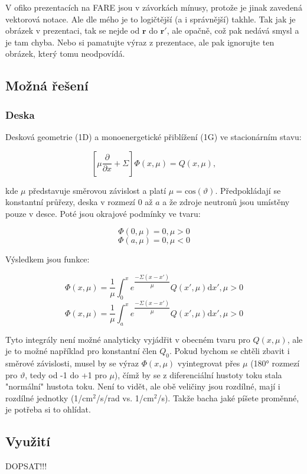 V ofiko prezentacích na FARE jsou v závorkách mínusy, protože je jinak zavedená vektorová notace. Ale dle mého je to logičtější (a i správnější) takhle. Tak jak je obrázek v prezentaci, tak se nejde od $\textbf{r}$ do $\textbf{r}'$, ale opačně, což pak nedává smysl a je tam chyba. Nebo si pamatujte výraz z prezentace, ale pak ignorujte ten obrázek, který tomu neodpovídá.

\subsection{Možná řešení}

\subsubsection{Deska}

Desková geometrie (1D) a monoenergetické přiblížení (1G) ve stacionárním stavu:

$$\left [ \mu \dfrac{\partial}{\partial x} + \Sigma \right ] \Phi(x, \mu) = Q(x, \mu),$$

\noindent kde $\mu$ představuje směrovou závislost a platí $\mu = \text{cos}(\vartheta)$. Předpokládají se konstantní průřezy, deska v rozmezí $0$ až $a$ a že zdroje neutronů jsou umístěny pouze v desce. Poté jsou okrajové podmínky ve tvaru:

$$\Phi(0, \mu) = 0, \mu > 0$$
$$\Phi(a, \mu) = 0, \mu < 0$$

Výsledkem jsou funkce:

$$\Phi(x, \mu) = \dfrac{1}{\mu} \int_0^x e^{\dfrac{-\Sigma (x-x')}{\mu}} Q(x', \mu) \text{d}x', \mu > 0$$
$$\Phi(x, \mu) = \dfrac{1}{\mu} \int_a^x e^{\dfrac{-\Sigma (x-x')}{\mu}} Q(x', \mu) \text{d}x', \mu > 0$$

Tyto integrály není možné analyticky vyjádřit v obecném tvaru pro $Q(x, \mu)$, ale je to možné například pro konstantní člen $Q_0$. Pokud bychom se chtěli zbavit i směrové závislosti, musel by se výraz $\Phi(x, \mu)$ vyintegrovat přes $\mu$ (180° rozmezí pro $\vartheta$, tedy od -1 do +1 pro $\mu$), čímž by se z diferenciální hustoty toku stala "normální" hustota toku. Není to vidět, ale obě veličiny jsou rozdílné, mají i rozdílné jednotky (1/cm$^2$/s/rad vs. 1/cm$^2$/s). Takže bacha jaké píšete proměnné, je potřeba si to ohlídat.

\subsection{Využití}

DOPSAT!!!